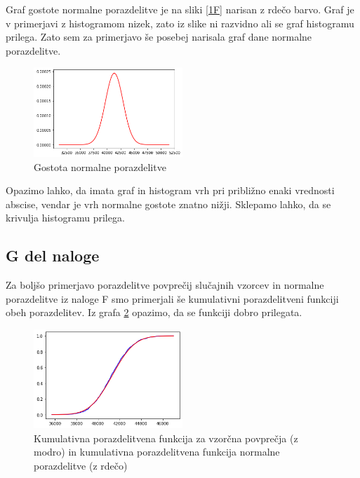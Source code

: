\documentclass{article}
\begin{document}
Graf gostote normalne porazdelitve je na sliki \ref{1F} narisan z rdečo barvo. 
Graf je v primerjavi z histogramom nizek, zato iz slike ni razvidno ali se graf histogramu prilega.
Zato sem za primerjavo še posebej narisala graf dane normalne porazdelitve. 

\begin{figure}[H]
    \begin{center}
        \includegraphics*[width=0.5\textwidth]{figure1F(1).png}
        \caption{Gostota normalne porazdelitve}
        \label{1F*}
    \end{center}
\end{figure}
Opazimo lahko, da imata graf in histogram vrh pri približno enaki vrednosti abscise, vendar je vrh normalne 
gostote znatno nižji. Sklepamo lahko, da se krivulja histogramu prilega.


\subsection{G del naloge}
Za boljšo primerjavo porazdelitve povprečij slučajnih vzorcev in normalne porazdelitve iz naloge F
smo primerjali še kumulativni porazdelitveni funkciji obeh porazdelitev.
Iz grafa \ref*{CDFpovprecja} opazimo, da se funkciji dobro prilegata.
\begin{figure}[H]
    \begin{center}
        \includegraphics*[width=0.5\textwidth]{figure1G.png}
        \caption{Kumulativna porazdelitvena funkcija za vzorčna povprečja (z modro) in kumulativna porazdelitvena funkcija normalne porazdelitve (z rdečo)}
        \label{CDFpovprecja}
    \end{center}
\end{figure}
\end{document}
